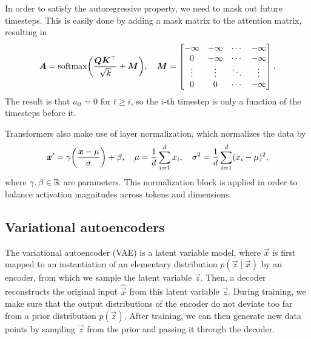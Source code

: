 In order to satisfy the autoregressive property, we need to mask out future timesteps. This is
easily done by adding a mask matrix to the attention matrix, resulting in \[
    \mat{A} = \mathrm{softmax} \lft( \frac{\mat{Q} \transpose{\mat{K}}}{\sqrt{k}} + \mat{M} \rgt), \quad \mat{M} =
    \begin{bmatrix}
        -\infty & -\infty & \cdots & -\infty \\
        0       & -\infty & \cdots & -\infty \\
        \vdots  & \vdots  & \ddots & \vdots  \\
        0       & 0       & \cdots & -\infty
    \end{bmatrix}.
\]
The result is that $a_{it} = 0$ for $t \geq i$, so the $i$-th timestep is only a function of the
timesteps before it.

Transformers also make use of layer normalization, which normalizes the data by \[
    \vec{x}' = \gamma \lft( \frac{\vec{x} - \mu}{\sigma} \rgt) + \beta, \quad \mu = \frac{1}{d} \sum_{i=1}^{d} x_i, \quad \sigma^2 = \frac{1}{d} \sum_{i=1}^{d} (x_i - \mu)^2,
\]
where $\gamma, \beta \in \mathbb{R}$ are parameters. This normalization block is applied in order to
balance activation magnitudes across tokens and dimensions.

\subsection{Variational autoencoders}

The variational autoencoder (VAE) is a latent variable model, where $\vec{x}$ is first mapped to an
instantiation of an elementary distribution $p(\vec{z} \mid \vec{x})$ by an encoder, from which we
sample the latent variable $\vec{z}$. Then, a decoder reconstructs the original input
$\hat{\vec{x}}$ from this latent variable $\vec{z}$. During training, we make sure that the output
distributions of the encoder do not deviate too far from a prior distribution $p(\vec{z})$. After
training, we can then generate new data points by sampling $\vec{z}$ from the prior and passing it
through the decoder.

